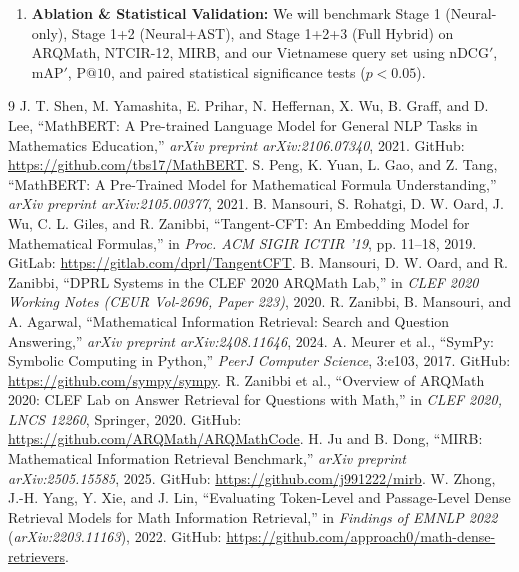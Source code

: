 ﻿\documentclass[11pt,a4paper]{article}
\begin{document}
\begin{enumerate}
\begin{itemize}
		\end{itemize}
		\item \textbf{Ablation \& Statistical Validation:} We will benchmark Stage 1 (Neural-only), Stage 1+2 (Neural+AST), and Stage 1+2+3 (Full Hybrid) on ARQMath, NTCIR-12, MIRB, and our Vietnamese query set using $\text{nDCG}'$, $\text{mAP}'$, $\text{P}@10$, and paired statistical significance tests ($p < 0.05$).
	\end{enumerate}

	\begin{thebibliography}{9}
		 J. T. Shen, M. Yamashita, E. Prihar, N. Heffernan, X. Wu, B. Graff, and D. Lee, ``MathBERT: A Pre-trained Language Model for General NLP Tasks in Mathematics Education,'' \textit{arXiv preprint arXiv:2106.07340}, 2021. GitHub: \url{https://github.com/tbs17/MathBERT}.
		 S. Peng, K. Yuan, L. Gao, and Z. Tang, ``MathBERT: A Pre-Trained Model for Mathematical Formula Understanding,'' \textit{arXiv preprint arXiv:2105.00377}, 2021.
		 B. Mansouri, S. Rohatgi, D. W. Oard, J. Wu, C. L. Giles, and R. Zanibbi, ``Tangent-CFT: An Embedding Model for Mathematical Formulas,'' in \textit{Proc. ACM SIGIR ICTIR '19}, pp. 11--18, 2019. GitLab: \url{https://gitlab.com/dprl/TangentCFT}.
		 B. Mansouri, D. W. Oard, and R. Zanibbi, ``DPRL Systems in the CLEF 2020 ARQMath Lab,'' in \textit{CLEF 2020 Working Notes (CEUR Vol-2696, Paper 223)}, 2020.
		 R. Zanibbi, B. Mansouri, and A. Agarwal, ``Mathematical Information Retrieval: Search and Question Answering,'' \textit{arXiv preprint arXiv:2408.11646}, 2024.
		 A. Meurer et al., ``SymPy: Symbolic Computing in Python,'' \textit{PeerJ Computer Science}, 3:e103, 2017. GitHub: \url{https://github.com/sympy/sympy}.
		 R. Zanibbi et al., ``Overview of ARQMath 2020: CLEF Lab on Answer Retrieval for Questions with Math,'' in \textit{CLEF 2020, LNCS 12260}, Springer, 2020. GitHub: \url{https://github.com/ARQMath/ARQMathCode}.
		 H. Ju and B. Dong, ``MIRB: Mathematical Information Retrieval Benchmark,'' \textit{arXiv preprint arXiv:2505.15585}, 2025. GitHub: \url{https://github.com/j991222/mirb}.
		 W. Zhong, J.-H. Yang, Y. Xie, and J. Lin, ``Evaluating Token-Level and Passage-Level Dense Retrieval Models for Math Information Retrieval,'' in \textit{Findings of EMNLP 2022} (\textit{arXiv:2203.11163}), 2022. GitHub: \url{https://github.com/approach0/math-dense-retrievers}.
	\end{thebibliography}
\end{document}
